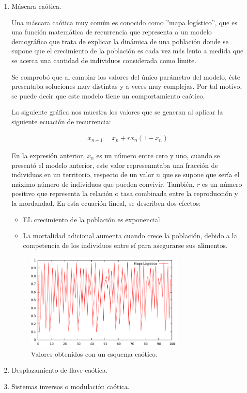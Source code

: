 \documentclass[10pt]{IEEEtran}
\begin{document}
\begin{enumerate}
\item Máscara caótica.

Una máscara caótica muy común es conocido como ''mapa logístico'', que es una función matemática de recurrencia que representa a un modelo demográfico que trata de explicar la dinámica de una población donde se supone que el crecimiento de la población es cada vez más lento a medida que se acerca una cantidad de individuos considerada como límite.

Se comprobó que al cambiar los valores del único parámetro del modelo, éste presentaba soluciones muy distintas y a veces muy complejas. Por tal motivo, se puede decir que este modelo tiene un comportamiento caótico.

La siguiente gráfica nos muestra los valores que se generan al aplicar la siguiente ecuación de recurrencia:


\begin{equation*}
\begin{aligned}
x_{n+1}= x_{n}+rx_{n}(1-x_{n})
\end{aligned}
\end{equation*}

En la expresión anterior,  $x_{n}$ es un número entre cero y uno, cuando se presentó el modelo anterior, este valor represenmtaba una fracción de individuos en un territorio, respecto de un valor $n$ que se supone que sería el máximo número de individuos que pueden convivir. También, $r$ es un número positivo que representa la relación o tasa combinada entre la reproducción y la mordandad. En esta ecuación lineal, se describen dos efectos:

\begin{itemize}
\item EL crecimiento de la población es exponencial.
\item La mortalidad adicional aumenta cuando crece la población, debido a la competencia de los individuos entre sí para asegurarse sus alimentos.
\end{itemize}
\begin{figure}[h]
\centering
\includegraphics[width=8cm]{ss.png}
\caption{Valores obtenidos con un esquema caótico.}
\label{valores}
\end{figure}

\item Desplazamiento de llave caótica.
\item Sistemas inversos o modulación caótica.
\end{enumerate}
\end{document}
